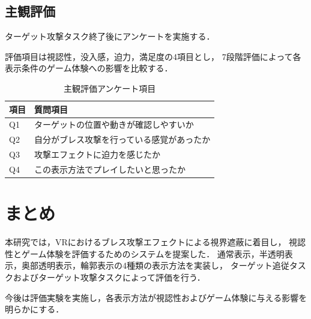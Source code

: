 \documentclass[uplatex,9pt]{jsarticle}
\begin{document}
\subsection{主観評価}

ターゲット攻撃タスク終了後にアンケートを実施する．

評価項目は視認性，没入感，迫力，満足度の4項目とし，
7段階評価によって各表示条件のゲーム体験への影響を比較する．

\begin{table}[htbp]
  \caption{主観評価アンケート項目}
  \label{tab:menu}
  \centering
  \begin{tabular}[h]{l|l}
    \hline
    \hline
    項目 & 質問項目 \\
    \hline
    Q1 & ターゲットの位置や動きが確認しやすいか \\
    Q2 & 自分がブレス攻撃を行っている感覚があったか \\
    Q3 & 攻撃エフェクトに迫力を感じたか \\
    Q4 & この表示方法でプレイしたいと思ったか \\
    \hline
  \end{tabular}
\end{table}

\section{まとめ}

本研究では，VRにおけるブレス攻撃エフェクトによる視界遮蔽に着目し，
視認性とゲーム体験を評価するためのシステムを提案した．
通常表示，半透明表示，奥部透明表示，輪郭表示の4種類の表示方法を実装し，
ターゲット追従タスクおよびターゲット攻撃タスクによって評価を行う．

今後は評価実験を実施し，各表示方法が視認性およびゲーム体験に与える影響を明らかにする．




\end{document}
